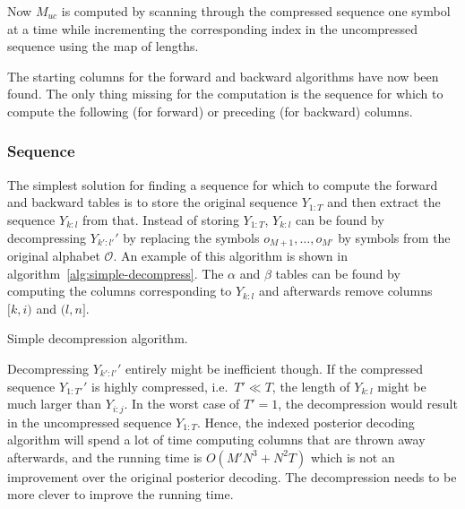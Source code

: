 Now $M_{uc}$ is computed by scanning through the
compressed sequence one symbol at a time while incrementing the corresponding
index in the uncompressed sequence using the map of lengths.

The starting columns for the forward and backward algorithms have now been
found. The only thing missing for the computation is the sequence for which to
compute the following (for forward) or preceding (for backward) columns.

\subsubsection{Sequence}

The simplest solution for finding a sequence for which to compute the forward
and backward tables is to store the original sequence $Y_{1:T}$ and then
extract the sequence $Y_{k:l}$ from that. Instead of storing $Y_{1:T}$,
$Y_{k:l}$ can be found by decompressing $Y_{k':l'}'$ by
replacing the symbols $o_{M + 1}, \dots, o_{M'}$ by symbols from the original
alphabet $\mathcal{O}$. An example of this algorithm is shown in
algorithm~\ref{alg:simple-decompress}. The $\alpha$ and $\beta$ tables can be
found by computing the columns corresponding to $Y_{k:l}$ and afterwards remove
columns $[k, i)$ and $(l, n]$.

\begin{algorithm}
  \caption{Simple decompression algorithm.}
  \label{alg:simple-decompress}
  \begin{algorithmic}[1]
        \EndFor{}
    \EndProcedure{}
  \end{algorithmic}
\end{algorithm}

Decompressing $Y_{k':l'}'$ entirely might be inefficient though. If the
compressed sequence $Y_{1:T'}'$ is highly compressed, i.e.\ $T' \ll T$, the
length of $Y_{k:l}$ might be much larger than $Y_{i:j}$. In the worst case of
$T' = 1$, the decompression would result in the uncompressed sequence
$Y_{1:T}$. Hence, the indexed posterior decoding algorithm will spend a lot of
time computing columns that are thrown away afterwards, and the running time is
$O(M' N^3 + N^2 T)$ which is not an improvement over the original
posterior decoding. The decompression needs to be more clever to improve the
running time.

